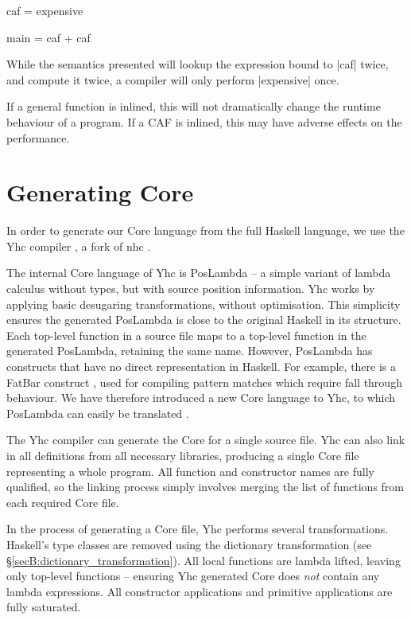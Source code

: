 \begin{example}
\begin{code}
caf = expensive

main = caf + caf
\end{code}

While the semantics presented will lookup the expression bound to |caf| twice, and compute it twice, a compiler will only perform |expensive| once.
\end{example}

If a general function is inlined, this will not dramatically change the runtime behaviour of a program. If a CAF is inlined, this may have adverse effects on the performance.


\section{Generating Core}
\label{secB:generating_core}

In order to generate our Core language from the full Haskell language, we use the Yhc compiler \cite{yhc}, a fork of nhc \cite{nhc}.

The internal Core language of Yhc is PosLambda -- a simple variant of lambda calculus without types, but with source position information. Yhc works by applying basic desugaring transformations, without optimisation. This simplicity ensures the generated PosLambda is close to the original Haskell in its structure. Each top-level function in a source file maps to a top-level function in the generated PosLambda, retaining the same name. However, PosLambda has constructs that have no direct representation in Haskell. For example, there is a FatBar construct \cite{spj:implementation}, used for compiling pattern matches which require fall through behaviour. We have therefore introduced a new Core language to Yhc, to which PosLambda can easily be translated \cite{me:yhc_core}.

The Yhc compiler can generate the Core for a single source file. Yhc can also link in all definitions from all necessary libraries, producing a single Core file representing a whole program. All function and constructor names are fully qualified, so the linking process simply involves merging the list of functions from each required Core file.

In the process of generating a Core file, Yhc performs several transformations. Haskell's type classes are removed using the dictionary transformation (see \S\ref{secB:dictionary_transformation}). All local functions are lambda lifted, leaving only top-level functions -- ensuring Yhc generated Core does \textit{not} contain any lambda expressions. All constructor applications and primitive applications are fully saturated.


